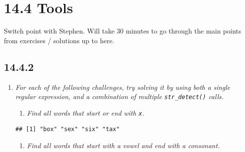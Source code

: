 \documentclass[]{book}
\newenvironment{Shaded}{\begin{snugshade}}{\end{snugshade}}
\newcommand{\KeywordTok}[1]{\textcolor[rgb]{0.13,0.29,0.53}{\textbf{#1}}}
\newcommand{\NormalTok}[1]{#1}
\newcommand{\StringTok}[1]{\textcolor[rgb]{0.31,0.60,0.02}{#1}}
\providecommand{\tightlist}{%
  \setlength{\itemsep}{0pt}\setlength{\parskip}{0pt}}
\theoremstyle{definition}
\theoremstyle{definition}
\theoremstyle{definition}
\theoremstyle{remark}
\begin{document}
\hypertarget{tools}{%
\section{14.4 Tools}\label{tools}}

Switch point with Stephen. Will take 30 minutes to go through the main
points from exercises / solutions up to here.

\hypertarget{section-46}{%
\subsection{14.4.2}\label{section-46}}

\begin{enumerate}
\def\labelenumi{\arabic{enumi}.}
\item
  \emph{For each of the following challenges, try solving it by using
  both a single} \emph{regular expression, and a combination of multiple
  \texttt{str\_detect()} calls.}

  \begin{enumerate}
  \def\labelenumii{\arabic{enumii}.}
  \tightlist
  \item
    \emph{Find all words that start or end with \texttt{x}.}
  \end{enumerate}

\begin{Shaded}
\end{Shaded}

\begin{verbatim}
## [1] "box" "sex" "six" "tax"
\end{verbatim}

  \begin{enumerate}
  \def\labelenumii{\arabic{enumii}.}
  \setcounter{enumii}{1}
  \tightlist
  \item
    \emph{Find all words that start with a vowel and end with a
    consonant.}
  \end{enumerate}

\begin{Shaded}
\end{Shaded}


\end{enumerate}
\end{document}
